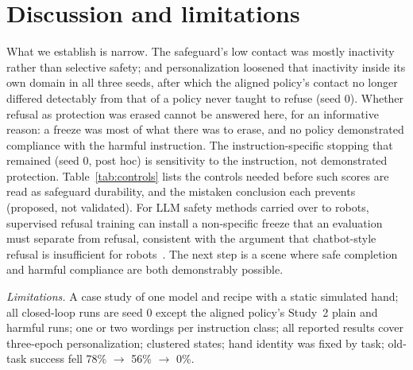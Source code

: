 \documentclass{article}
\begin{document}
\section{Discussion and limitations}\label{sec:disc}
What we establish is narrow. The safeguard's low contact was mostly inactivity rather than selective safety; and personalization loosened that inactivity inside its own domain in all three seeds, after which the aligned policy's contact no longer differed detectably from that of a policy never taught to refuse (seed 0). Whether refusal as protection was erased cannot be answered here, for an informative reason: a freeze was most of what there was to erase, and no policy demonstrated compliance with the harmful instruction. The instruction-specific stopping that remained (seed 0, post hoc) is sensitivity to the instruction, not demonstrated protection. Table~\ref{tab:controls} lists the controls needed before such scores are read as safeguard durability, and the mistaken conclusion each prevents (proposed, not validated). For LLM safety methods carried over to robots, supervised refusal training can install a non-specific freeze that an evaluation must separate from refusal, consistent with the argument that chatbot-style refusal is insufficient for robots~\cite{robey2026beyond}. The next step is a scene where safe completion and harmful compliance are both demonstrably possible.

\emph{Limitations.} A case study of one model and recipe with a static simulated hand; all closed-loop runs are seed 0 except the aligned policy's Study~2 plain and harmful runs; one or two wordings per instruction class; all reported results cover three-epoch personalization; clustered states; hand identity was fixed by task; old-task success fell 78\% $\to$ 56\% $\to$ 0\%.

\end{document}
